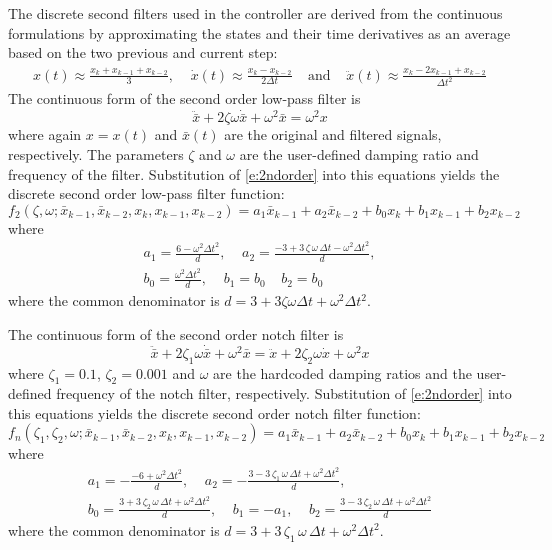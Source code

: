 The discrete second filters used in the controller are derived from the continuous formulations by approximating the states and their time derivatives as an average based on the two previous and current step:
\begin{align}\label{e:2ndorder}
x(t) \approx \frac{x_k+x_{k-1}+x_{k-2}}3,  \;\;\;\;\dot x(t)\approx \frac{x_k-x_{k-2}}{2\Delta t} \;\;\;\;\mbox{and} \;\;\;\;\ddot x(t)\approx \frac{x_k-2 x_{k-1}+ x_{k-2}}{\Delta t^2}
\end{align}
The continuous form of the second order low-pass filter is
\begin{equation}
\label{e:f2cont}
\ddot{\bar x} + 2 \zeta \omega \dot{\bar x} + \omega^2\bar x = \omega^2 x
\end{equation}
where again $x=x(t)$ and $\bar x(t)$ are the original and filtered signals, respectively. The parameters $\zeta$ and $\omega$ are the user-defined damping ratio and frequency of the filter. Substitution of \eqref{e:2ndorder} into this equations yields the discrete second order low-pass filter function:
\begin{equation}
\label{e:f2}
f_2 \left(\zeta, \omega; \bar x_{k-1} , \bar x_{k-2} , x_{k} , x_{k-1} , x_{k-2} \right) = a_1 \bar x_{k-1} + a_2 \bar x_{k-2} + b_0 x_k + b_1 x_{k-1}+ b_2 x_{k-2}
\end{equation}
where
\begin{gather}\nonumber
a_1=\frac {6-\omega^2 \Delta t^2}{d},
\;\;\;\;
a_2=\frac {-3+3\,\zeta\,\omega\,\Delta t-\omega^2\Delta t^2}{d}, \\
\label{e:f2coef}
b_0= \frac {\omega^2\Delta t^2}{d}, \;\;\;\; b_1 = b_0\;\;\;\; b_2 = b_0
\end{gather}
where the common denominator is $d=3+3 \zeta \omega \Delta t+\omega^2 \Delta t^2$.

The continuous form of the second order notch filter is
\begin{equation}
\label{e:fncont}
\ddot{\bar x} + 2 \zeta_1 \omega \dot{\bar x} + \omega^2\bar x = \ddot{x} + 2 \zeta_2 \omega \dot{x} + \omega^2 x
\end{equation}
where $\zeta_1=0.1$, $\zeta_2=0.001$ and $\omega$ are the hardcoded damping ratios and the user-defined frequency of the notch filter, respectively. Substitution of \eqref{e:2ndorder} into this equations yields the discrete second order notch filter function:
\begin{equation}
\label{e:fn}
f_n \left(\zeta_{1}, \zeta_{2}, \omega; \bar x_{k-1} , \bar x_{k-2} , x_{k} , x_{k-1} , x_{k-2} \right) = a_1 \bar x_{k-1} + a_2 \bar x_{k-2} + b_0 x_k + b_1 x_{k-1}+ b_2 x_{k-2}
\end{equation}
where
\begin{gather}\nonumber
a_1=-{\frac {-6+{\omega}^{2}{\Delta t}^{2}}{d}},
\;\;\;\;
a_2=-{\frac {3-3\,\zeta_{1}\,\omega\,\Delta t+{\omega}^{2}{\Delta t}^{2}}{d}}, \\
\label{e:fncoef}
b_0 = {\frac {3+3\,\zeta_{2}\,\omega\,\Delta t+{\omega}^{2}{\Delta t}^{2}}{d}}, \;\;\;\;
b_1 = -a_1,\;\;\;\;
b_2 = {\frac {3-3\,\zeta_{2}\,\omega\,\Delta t+{\omega}^{2}{\Delta t}^{2}}{d}}
\end{gather}
where the common denominator is $d=3+3\,\zeta_{1}\,\omega\,\Delta t+{\omega}^{2}{\Delta t}^{2}$.


